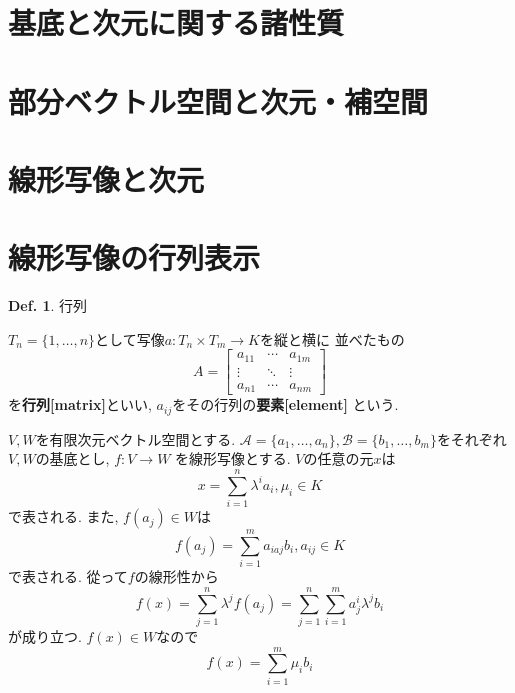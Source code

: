 \documentclass[a4paper,10pt,report]{amsart}
\theoremstyle{plain}
\theoremstyle{definition}
\newtheorem{defn}{Def.}[section]
\theoremstyle{remark}
\begin{document}
\section{基底と次元に関する諸性質}
\section{部分ベクトル空間と次元・補空間}
\section{線形写像と次元}
\section{線形写像の行列表示}
\begin{leftbar}
    \begin{defn}行列\par
        \(T_{n}=\{1,\dots,n\} \)として写像\(a:T_{n}\times T_{m}\to K\)を縦と横に
        並べたもの
        \begin{equation}
            A=
            \begin{bmatrix}
                a_{11} & \cdots & a_{1m} \\ 
                \vdots & \ddots & \vdots \\ 
                a_{n1} & \cdots & a_{nm}
            \end{bmatrix}
        \end{equation}
        を\textbf{行列[matrix]}といい, \(a_{ij}\)をその行列の\textbf{要素[element]}
        という. 
    \end{defn}
\end{leftbar}
\(V,W\)を有限次元ベクトル空間とする. \(\mathcal{A}=\{a_{1},\dots,a_{n}\},
\mathcal{B}=\{b_{1},\dots,b_{m}\} \)をそれぞれ\(V,W\)の基底とし, \(f:V\to{}W\)
を線形写像とする. \(V\)の任意の元\(x\)は
\begin{equation}
    x=\sum_{i=1}^{n}\lambda^{i}a_{i},\mu_{i}\in K
\end{equation}
で表される. また, \(f(a_{j})\in W\)は
\begin{equation}
    f(a_{j})=\sum_{i=1}^{m}a_{iaj}b_{i},a_{ij}\in K
\end{equation}
で表される. 從って\(f\)の線形性から
\begin{equation}
    f(x)=\sum_{j=1}^{n}\lambda^{j}f(a_{j})=\sum_{j=1}^{n}\sum_{i=1}^{m}a_{j}^{i}\lambda^{j}b_{i}
\end{equation}
が成り立つ. \(f(x)\in W\)なので
\begin{equation}
    f(x)=\sum_{i=1}^{m}\mu_{i}b_{i}
\end{equation}
\end{document}
